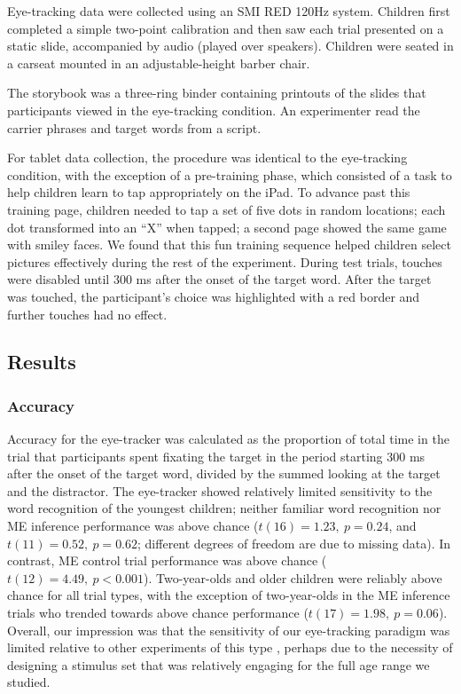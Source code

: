 \documentclass[man,noapacite]{apa2}
\begin{document}
Eye-tracking data were collected using an SMI RED 120Hz system. Children first completed a simple two-point calibration and then saw each trial presented on a static slide, accompanied by audio (played over speakers). Children were seated in a carseat mounted in an adjustable-height barber chair. 

The storybook was a three-ring binder containing printouts of the slides that participants viewed in the eye-tracking condition. An experimenter read the carrier phrases and target words from a script.

For tablet data collection, the procedure was identical to the eye-tracking condition, with the exception of a pre-training phase, which consisted of a task to help children learn to tap appropriately on the iPad. To advance past this training page, children needed to tap a set of five dots in random locations; each dot transformed into an ``X'' when tapped; a second page showed the same game with smiley faces. We found that this fun training sequence helped children select pictures effectively during the rest of the experiment. During test trials, touches were disabled until 300 ms after the onset of the target word. After the target was touched, the participant's choice was highlighted with a red border and further touches had no effect.  

\subsection{Results}

\subsubsection{Accuracy}

Accuracy for the eye-tracker was calculated as the proportion of total time in the trial that participants spent fixating the target in the period starting 300 ms after the onset of the target word, divided by the summed looking at the target and the distractor. The eye-tracker showed relatively limited sensitivity to the word recognition of the youngest children; neither familiar word recognition nor ME inference performance was above chance ($t(16) = 1.23,~p = 0.24$, and $t(11) = 0.52,~p = 0.62$; different degrees of freedom are due to missing data). In contrast, ME control trial performance was above chance ($t(12) = 4.49,~p < 0.001$). Two-year-olds and older children were reliably above chance for all trial types, with the exception of two-year-olds in the ME inference trials who trended towards above chance performance ($t(17) = 1.98,~p = 0.06$). Overall, our impression was that the sensitivity of our eye-tracking paradigm was limited relative to other experiments of this type \cite{fernald2006}, perhaps due to the necessity of designing a stimulus set that was relatively engaging for the full age range we studied. 
\end{document}
